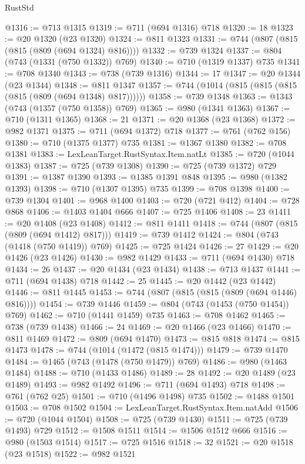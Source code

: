 \begin{lexlean}{RustStd}
\begin{coremodule}
@1316 := @713 @1315
@1319 := @711 (@694 @1316) @718
@1320 := 18
@1323 := @20 @1320 (@23 @1320)
@1324 := @811 @1323
@1331 := @744 (@807 (@815 (@815 (@809 (@694 @1324) @816))))
@1332 := @739 @1324
@1337 := @804 (@743 (@1331 (@750 @1332)) @769)
@1340 := @710 (@1319 @1337) @735
@1341 := @708 @1340
@1343 := @738 (@739 @1316)
@1344 := 17
@1347 := @20 @1344 (@23 @1344)
@1348 := @811 @1347
@1357 := @744 (@1014 (@815 (@815 (@815 (@815 (@809 (@694 @1348) @817))))))
@1358 := @739 @1348
@1363 := @1343 (@743 (@1357 (@750 @1358)) @769)
@1365 := @980 (@1341 @1363)
@1367 := @710 (@1311 @1365)
@1368 := 21
@1371 := @20 @1368 (@23 @1368)
@1372 := @982 @1371
@1375 := @711 (@694 @1372) @718
@1377 := @761 (@762 @156)
@1380 := @710 (@1375 @1377) @735
@1381 := @1367 @1380
@1382 := @708 @1381
@1383 := LexLeanTarget.RustSyntax.Item.natLt
@1385 := @720 (@1044 @1383)
@1387 := @725 (@739 @1308)
@1390 := @725 (@739 @1372) @729
@1391 := @1387 @1390
@1393 := @1385 @1391 @848
@1395 := @980 (@1382 @1393)
@1398 := @710 (@1307 @1395) @735
@1399 := @708 @1398
@1400 := @739 @1304
@1401 := @968 @1400
@1403 := @720 (@721 @412)
@1404 := @728 @868
@1406 := @1403 @1404 @666
@1407 := @725 @1406
@1408 := 23
@1411 := @20 @1408 (@23 @1408)
@1412 := @811 @1411
@1418 := @744 (@807 (@815 (@809 (@694 @1412) @817)))
@1419 := @739 @1412
@1424 := @804 (@743 (@1418 (@750 @1419)) @769)
@1425 := @725 @1424
@1426 := 27
@1429 := @20 @1426 (@23 @1426)
@1430 := @982 @1429
@1433 := @711 (@694 @1430) @718
@1434 := 26
@1437 := @20 @1434 (@23 @1434)
@1438 := @713 @1437
@1441 := @711 (@694 @1438) @718
@1442 := 25
@1445 := @20 @1442 (@23 @1442)
@1446 := @811 @1445
@1453 := @744 (@807 (@815 (@815 (@809 (@694 @1446) @816))))
@1454 := @739 @1446
@1459 := @804 (@743 (@1453 (@750 @1454)) @769)
@1462 := @710 (@1441 @1459) @735
@1463 := @708 @1462
@1465 := @738 (@739 @1438)
@1466 := 24
@1469 := @20 @1466 (@23 @1466)
@1470 := @811 @1469
@1472 := @809 (@694 @1470)
@1473 := @815 @818
@1474 := @815 @1473
@1478 := @744 (@1014 (@1472 (@815 @1474)))
@1479 := @739 @1470
@1484 := @1465 (@743 (@1478 (@750 @1479)) @769)
@1486 := @980 (@1463 @1484)
@1488 := @710 (@1433 @1486)
@1489 := 28
@1492 := @20 @1489 (@23 @1489)
@1493 := @982 @1492
@1496 := @711 (@694 @1493) @718
@1498 := @761 (@762 @25)
@1501 := @710 (@1496 @1498) @735
@1502 := @1488 @1501
@1503 := @708 @1502
@1504 := LexLeanTarget.RustSyntax.Item.natAdd
@1506 := @720 (@1044 @1504)
@1508 := @725 (@739 @1430)
@1511 := @725 (@739 @1493) @729
@1512 := @1508 @1511
@1514 := @1506 @1512 @666
@1516 := @980 (@1503 @1514)
@1517 := @725 @1516
@1518 := 32
@1521 := @20 @1518 (@23 @1518)
@1522 := @982 @1521

\end{coremodule}
\end{lexlean}
